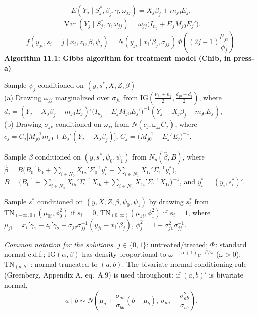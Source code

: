 \documentclass[11pt,a4paper]{article}
\begin{document}
\[
E(Y_j\mid S_j^*,\beta_j,\gamma,\omega_{jj})=X_j\beta_j+m_{j0}E_j,\tag{11.6}
\]
\[
\operatorname{Var}(Y_j\mid S_j^*,\gamma,\omega_{jj})=\omega_{jj}\big(I_{n_j}+E_jM_{j0}E_j'\big).\tag{11.7}
\]
\[
f(y_{ji},s_i=j\mid x_i,z_i,\beta,\psi_j)=N(y_{ji}\mid x_i'\beta_j,\sigma_{jj})\,\Phi\!\left((2j-1)\frac{\mu_{ji}}{\phi_j}\right).\tag{11.8}
\]
\textbf{Algorithm 11.1: Gibbs algorithm for treatment model (Chib, in press-a)}
\begin{description}[leftmargin=2.2em,font=\normalfont\bfseries]
\item[11.1] Sample $\psi_j$ conditioned on $(y,s^*,X,Z,\beta)$\\
(a) Drawing $\omega_{jj}$ marginalized over $\sigma_{jv}$ from
$\mathrm{IG}\left(\frac{\nu_{j0}+n_j}{2},\frac{d_{j0}+d_j}{2}\right)$, where
$d_j=(Y_j-X_j\beta_j-m_{j0}E_j)'\big(I_{n_j}+E_jM_{j0}E_j'\big)^{-1}(Y_j-X_j\beta_j-m_{j0}E_j)$,\\
(b) Drawing $\sigma_{jv}$ conditioned on $\omega_{jj}$ from $N(c_j,\omega_{jj}C_j)$, where
$c_j=C_j\big[M_{j0}^{-1}m_{j0}+E_j'(Y_j-X_j\beta_j)\big]$, $C_j=\big(M_{j0}^{-1}+E_j'E_j\big)^{-1}$.
\item[11.2] Sample $\beta$ conditioned on $(y,s^*,\psi_0,\psi_1)$ from $N_p(\hat\beta,B)$, where
$\hat\beta=B\big(B_0^{-1}b_0+\sum_{i\in N_0}X_{0i}'\Sigma_0^{-1}y_i^*+\sum_{i\in N_1}X_{1i}'\Sigma_1^{-1}y_i^*\big)$,
$B=\big(B_0^{-1}+\sum_{i\in N_0}X_{0i}'\Sigma_0^{-1}X_{0i}+\sum_{i\in N_1}X_{1i}'\Sigma_1^{-1}X_{1i}\big)^{-1}$,
and $y_i^*=(y_i,s_i^*)'$.
\item[11.3] Sample $s^*$ conditioned on $(y,X,Z,\beta,\psi_0,\psi_1)$ by drawing $s_i^*$ from
$\mathrm{TN}_{(-\infty,0)}(\mu_{0i},\phi_0^2)$ if $s_i=0$, $\mathrm{TN}_{(0,\infty)}(\mu_{1i},\phi_1^2)$ if $s_i=1$, where
$\mu_{ji}=x_i'\gamma_1+z_i'\gamma_2+\sigma_{jv}\sigma_{jj}^{-1}(y_{ji}-x_i'\beta_j)$, $\phi_j^2=1-\sigma_{jv}^2\sigma_{jj}^{-1}$.
\end{description}

\noindent\textit{Common notation for the solutions.} $j\in\{0,1\}$: untreated/treated; $\Phi$: standard
normal c.d.f.; $\mathrm{IG}(\alpha,\beta)$ has density proportional to $\omega^{-(\alpha+1)}e^{-\beta/\omega}$
($\omega>0$); $\mathrm{TN}_{(a,b)}$: normal truncated to $(a,b)$. The bivariate-normal conditioning rule
(Greenberg, Appendix A, eq.~A.9) is used throughout: if $(a,b)'$ is bivariate normal,
\[
a\mid b\sim N\!\left(\mu_a+\frac{\sigma_{ab}}{\sigma_{bb}}(b-\mu_b),\ \sigma_{aa}-\frac{\sigma_{ab}^2}{\sigma_{bb}}\right).\tag{A.9}
\]
\end{document}
